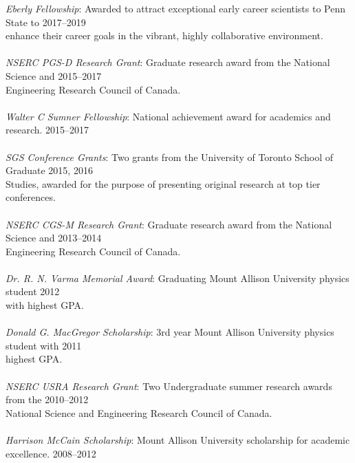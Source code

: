 \documentclass[10pt]{res} %
\begin{document}
\begin{resume}
\vspace{8pt} %
{\sl Eberly Fellowship}: Awarded to attract exceptional early career scientists to Penn State to \hfill 2017--2019 \\
enhance their career goals in the vibrant, highly collaborative environment.\\ \\
{\sl NSERC PGS-D Research Grant}: Graduate research award from the National Science and \hfill 2015--2017 \\
Engineering Research Council of Canada.\\ \\
{\sl Walter C Sumner Fellowship}: National achievement award for academics and research. \hfill 2015--2017 \\ \\
{\sl SGS Conference Grants}: Two grants from the University of Toronto School of Graduate \hfill 2015, 2016 \\
Studies, awarded for the purpose of presenting original research at top tier conferences. \\ \\
{\sl NSERC CGS-M Research Grant}: Graduate research award from the National Science and \hfill 2013--2014 \\
Engineering Research Council of Canada.\\ \\
{\sl Dr. R. N. Varma Memorial Award}: Graduating Mount Allison University physics student \hfill 2012 \\
with highest GPA. \\ \\
{\sl Donald G. MacGregor Scholarship}: 3rd year Mount Allison University physics student with \hfill 2011 \\ 
highest GPA. \\ \\
{\sl NSERC USRA Research Grant}: Two Undergraduate summer research awards from the  \hfill 2010--2012 \\
National Science and Engineering Research Council of Canada.\\ \\
{\sl Harrison McCain Scholarship}: Mount Allison University scholarship for academic excellence. \hfill 2008--2012 \\

 
\vspace{0.2in} %


\end{resume}
\end{document}
